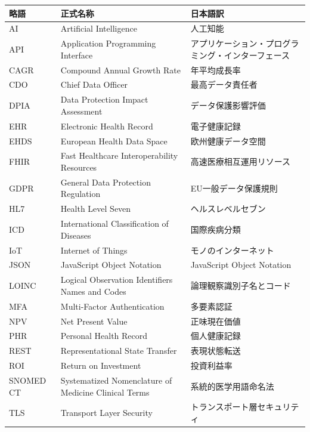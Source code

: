 \documentclass[
  a4paper,
  a4paper,
  11pt]{ltjsbook}
\begin{document}
\begin{longtable}[]{@{}
  >{\raggedright\arraybackslash}p{}
  >{\raggedright\arraybackslash}p{}
  >{\raggedright\arraybackslash}p{}@{}}
\toprule\noalign{}
\begin{minipage}[b]{\linewidth}\raggedright
略語
\end{minipage} & \begin{minipage}[b]{\linewidth}\raggedright
正式名称
\end{minipage} & \begin{minipage}[b]{\linewidth}\raggedright
日本語訳
\end{minipage} \\
\midrule\noalign{}
\endhead
\bottomrule\noalign{}
\endlastfoot
AI & Artificial Intelligence & 人工知能 \\
API & Application Programming Interface &
アプリケーション・プログラミング・インターフェース \\
CAGR & Compound Annual Growth Rate & 年平均成長率 \\
CDO & Chief Data Officer & 最高データ責任者 \\
DPIA & Data Protection Impact Assessment & データ保護影響評価 \\
EHR & Electronic Health Record & 電子健康記録 \\
EHDS & European Health Data Space & 欧州健康データ空間 \\
FHIR & Fast Healthcare Interoperability Resources &
高速医療相互運用リソース \\
GDPR & General Data Protection Regulation & EU一般データ保護規則 \\
HL7 & Health Level Seven & ヘルスレベルセブン \\
ICD & International Classification of Diseases & 国際疾病分類 \\
IoT & Internet of Things & モノのインターネット \\
JSON & JavaScript Object Notation & JavaScript Object Notation \\
LOINC & Logical Observation Identifiers Names and Codes &
論理観察識別子名とコード \\
MFA & Multi-Factor Authentication & 多要素認証 \\
NPV & Net Present Value & 正味現在価値 \\
PHR & Personal Health Record & 個人健康記録 \\
REST & Representational State Transfer & 表現状態転送 \\
ROI & Return on Investment & 投資利益率 \\
SNOMED CT & Systematized Nomenclature of Medicine Clinical Terms &
系統的医学用語命名法 \\
TLS & Transport Layer Security & トランスポート層セキュリティ \\
\end{longtable}
\end{document}
